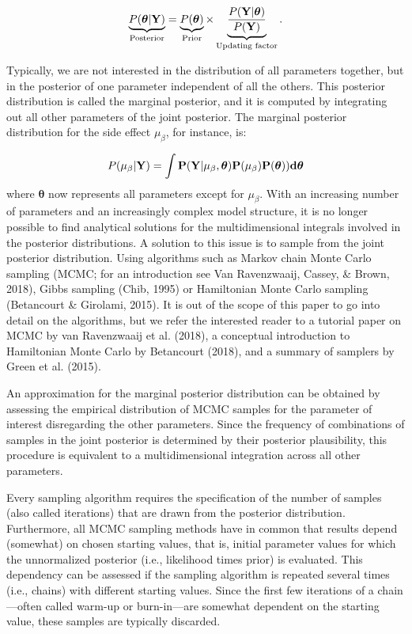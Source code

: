 \documentclass[
  english,
  doc,floatsintext]{apa6}
\begin{document}
\begin{equation}
\underbrace{P(\bm{\theta}|\bf{Y})}_{\text{Posterior}} = \underbrace{P(\bm{\theta})}_{\text{Prior}}\times\underbrace{\frac{P(\bf{Y}|\bm{\theta})}{P(\bf{Y})}}_{\text{Updating factor}}.
\label{eq:Bayesrule}
\end{equation}

Typically, we are not interested in the distribution of all parameters together, but in the posterior of one parameter independent of all the others. This posterior distribution is called the marginal posterior, and it is computed by integrating out all other parameters of the joint posterior. The marginal posterior distribution for the side effect \(\mu_{\beta}\), for instance, is:

\begin{equation}
P(\mu_{\beta}| \bf{Y}) = \int P(\bf{Y} | \mu_{\beta}, \bm{\theta})P(\mu_{\beta})P(\bm{\theta})) d\bm{\theta}  
\end{equation}
where \(\bm{\theta}\) now represents all parameters except for \(\mu_{\beta}\). With an increasing number of parameters and an increasingly complex model structure, it is no longer possible to find analytical solutions for the multidimensional integrals involved in the posterior distributions. A solution to this issue is to sample from the joint posterior distribution. Using algorithms such as Markov chain Monte Carlo sampling (MCMC; for an introduction see Van Ravenzwaaij, Cassey, \& Brown, 2018), Gibbs sampling (Chib, 1995) or Hamiltonian Monte Carlo sampling (Betancourt \& Girolami, 2015). It is out of the scope of this paper to go into detail on the algorithms, but we refer the interested reader to a tutorial paper on MCMC by van Ravenzwaaij et al. (2018), a conceptual introduction to Hamiltonian Monte Carlo by Betancourt (2018), and a summary of samplers by Green et al. (2015).

An approximation for the marginal posterior distribution can be obtained by assessing the empirical distribution of MCMC samples for the parameter of interest disregarding the other parameters. Since the frequency of combinations of samples in the joint posterior is determined by their posterior plausibility, this procedure is equivalent to a multidimensional integration across all other parameters.

Every sampling algorithm requires the specification of the number of samples (also called iterations) that are drawn from the posterior distribution. Furthermore, all MCMC sampling methods have in common that results depend (somewhat) on chosen starting values, that is, initial parameter values for which the unnormalized posterior (i.e., likelihood times prior) is evaluated. This dependency can be assessed if the sampling algorithm is repeated several times (i.e., chains) with different starting values. Since the first few iterations of a chain---often called warm-up or burn-in---are somewhat dependent on the starting value, these samples are typically discarded.
\end{document}

